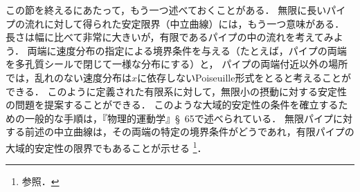 この節を終えるにあたって，もう一つ述べておくことがある．
無限に長いパイプの流れに対して得られた安定限界（中立曲線）には，もう一つ意味がある．
長さは幅に比べて非常に大きいが，有限であるパイプの中の流れを考えてみよう．
両端に速度分布の指定による境界条件を与える（たとえば，パイプの両端を多孔質シールで閉じて一様な分布にする）と，
パイプの両端付近以外の場所では，乱れのない速度分布は$x$に依存しないPoiseuille形式をとると考えることができる．
このように定義された有限系に対して，無限小の摂動に対する安定性の問題を提案することができる．
このような大域的安定性の条件を確立するための一般的な手順は，『物理的運動学』\S~65で述べられている．
無限パイプに対する前述の中立曲線は，その両端の特定の境界条件がどうであれ，有限パイプの大域的安定性の限界でもあることが示せる
\footnote{参照．}．



\BackToTheToc
